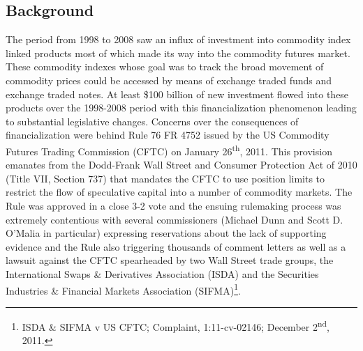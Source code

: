 \documentclass[12pt,]{article}
\let\rmarkdownfootnote\footnote%
\def\footnote{\protect\rmarkdownfootnote}
\begin{document}
\hypertarget{background}{%
\subsection{Background}\label{background}}

The period from 1998 to 2008 saw an influx of investment into commodity
index linked products most of which made its way into the commodity
futures market. These commodity indexes whose goal was to track the
broad movement of commodity prices could be accessed by means of
exchange traded funds and exchange traded notes. At least \$100 billion
of new investment flowed into these products over the 1998-2008 period
with this financialization phenomenon leading to substantial legislative
changes. Concerns over the consequences of financialization were behind
Rule 76 FR 4752 issued by the US Commodity Futures Trading Commission
(CFTC) on January 26\textsuperscript{th}, 2011. This provision emanates
from the Dodd-Frank Wall Street and Consumer Protection Act of 2010
(Title VII, Section 737) that mandates the CFTC to use position limits
to restrict the flow of speculative capital into a number of commodity
markets. The Rule was approved in a close 3-2 vote and the ensuing
rulemaking process was extremely contentious with several commissioners
(Michael Dunn and Scott D. O'Malia in particular) expressing
reservations about the lack of supporting evidence and the Rule also
triggering thousands of comment letters as well as a lawsuit against the
CFTC spearheaded by two Wall Street trade groups, the International
Swaps \& Derivatives Association (ISDA) and the Securities Industries \&
Financial Markets Association (SIFMA)\footnote{ISDA \& SIFMA v US CFTC;
  Complaint, 1:11-cv-02146; December 2\textsuperscript{nd}, 2011.}.
\end{document}
